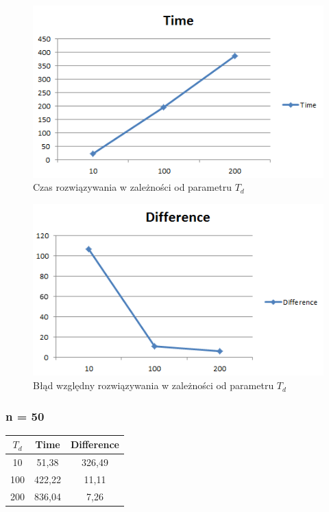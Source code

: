 \documentclass[wide,a4paper,titlepage,12pt] {article}
\begin{document}
\begin{figure}[htbp]
  \begin{center}
         \includegraphics[scale = 0.7]{charts/time40.PNG}
         \caption{Czas rozwiązywania w zależności od parametru $T_d$}
  \end{center}
\end{figure}

\begin{figure}[htbp]
  \begin{center}
         \includegraphics[scale=0.8]{charts/diff40.PNG}
         \caption{Błąd względny rozwiązywania w zależności od parametru $T_d$}
  \end{center}
\end{figure}

\newpage
\subsubsection{n = 50}
\begin{center}
    \begin{tabular}{|c|c|c|}
      \hline
       $T_{d}$ & Time & Difference \\ \hline
       10 & 51,38 &  326,49 \\ \hline
            100 &422,22 & 11,11\\ \hline
            200& 836,04  &7,26\\ \hline
  \end{tabular}
\end{center}
\end{document}
